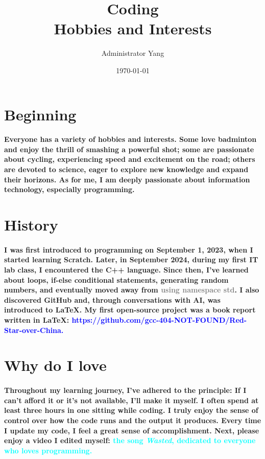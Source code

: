 \documentclass{article}
\title{Coding \\ \large{Hobbies and Interests}}
\author{Administrator Yang}
\date{\today}
\begin{document}
\maketitle
\section{Beginning}
\paragraph{\hspace{2em}Everyone has a variety of hobbies and interests. Some love badminton and enjoy the thrill of smashing a powerful shot; some are passionate about cycling, experiencing speed and excitement on the road; others are devoted to science, eager to explore new knowledge and expand their horizons. As for me, I am deeply passionate about information technology, especially programming.}
\section{History}
\paragraph{\hspace{2em}I was first introduced to programming on September 1, 2023, when I started learning Scratch. Later, in September 2024, during my first IT lab class, I encountered the C++ language. Since then, I’ve learned about loops, if-else conditional statements, generating random numbers, and eventually moved away from \textcolor{gray}{using namespace std}. I also discovered GitHub and, through conversations with AI, was introduced to LaTeX. My first open-source project was a book report written in LaTeX: \textcolor{blue}{https://github.com/gcc-404-NOT-FOUND/Red-Star-over-China.}}
\section{Why do I love}
\paragraph{\hspace{2em}Throughout my learning journey, I’ve adhered to the principle: If I can’t afford it or it’s not available, I’ll make it myself. I often spend at least three hours in one sitting while coding. I truly enjoy the sense of control over how the code runs and the output it produces. Every time I update my code, I feel a great sense of accomplishment. Next, please enjoy a video I edited myself: \textcolor{cyan}{the song \textit{Wasted}, dedicated to everyone who loves programming.}}
\end{document}
